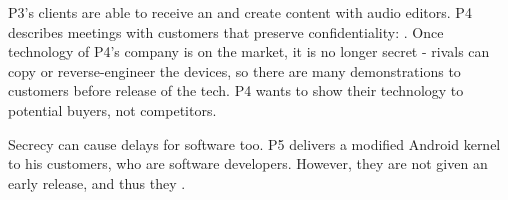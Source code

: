 P3's clients are able to receive an  and create content with audio editors.
P4 describes meetings with customers that preserve confidentiality:
.
Once technology of P4's company is on the market, it is no longer secret - rivals can copy or reverse-engineer the devices, so there are many demonstrations to customers before release of the tech.
P4 wants to show their technology to potential buyers, not competitors. %


Secrecy can cause delays for software too.
P5 delivers a modified Android kernel to his customers, who are software developers.
However, they are not given an early release, and thus they .



